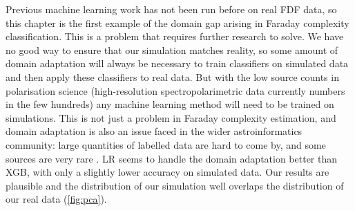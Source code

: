     Previous machine learning work \citep[e.g.][]{brown_classifying_2018} has not been run before on real FDF data, so this chapter is the first example of the domain gap arising in Faraday complexity classification. This is a problem that requires further research to solve. We have no good way to ensure that our simulation matches reality, so some amount of domain adaptation will always be necessary to train classifiers on simulated data and then apply these classifiers to real data. But with the low source counts in polarisation science (high-resolution spectropolarimetric data currently numbers in the few hundreds) any machine learning method will need to be trained on simulations. This is not just a problem in Faraday complexity estimation, and domain adaptation is also an issue faced in the wider astroinformatics community: large quantities of labelled data are hard to come by, and some sources are very rare \citep[e.g. gravitational wave detections or fast radio bursts;][]{zevin17gravityspy, gebhard19convolutional, agarwal20fetch}. LR seems to handle the domain adaptation better than XGB, with only a slightly lower accuracy on simulated data. Our results are plausible and the distribution of our simulation well overlaps the distribution of our real data (\autoref{fig:pca}).


